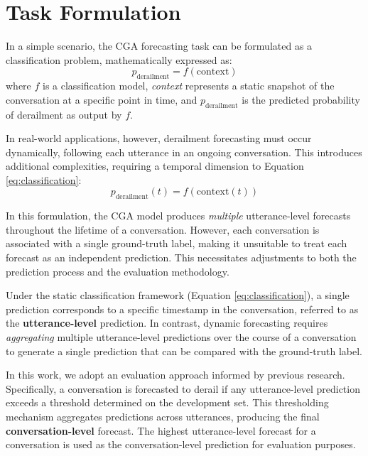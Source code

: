 \section{Task Formulation}
In a simple scenario, the CGA forecasting task can be formulated as a classification problem, mathematically expressed as:
\begin{equation}
p_{\mathrm{derailment}} = f(\mathrm{context})
\label{eq:classification}
\end{equation}
where $f$ is a classification model, \emph{context} represents a static snapshot of the conversation at a specific point in time, and $p_{\mathrm{derailment}}$ is the predicted probability of derailment as output by $f$.

In real-world applications, however, derailment forecasting must occur dynamically, following each utterance in an ongoing conversation. This introduces additional complexities, requiring a temporal dimension to Equation \ref{eq:classification}:
\begin{equation}
p_{\mathrm{derailment}}(t) = f(\mathrm{context}(t))
\label{eq:forecastingmodel}
\end{equation}

In this formulation, the CGA model produces \emph{multiple} utterance-level forecasts throughout the lifetime of a conversation. However, each conversation is associated with a single ground-truth label, making it unsuitable to treat each forecast as an independent prediction. This necessitates adjustments to both the prediction process and the evaluation methodology.

Under the static classification framework (Equation \ref{eq:classification}), a single prediction corresponds to a specific timestamp in the conversation, referred to as the \textbf{utterance-level} prediction. In contrast, dynamic forecasting requires \emph{aggregating} multiple utterance-level predictions over the course of a conversation to generate a single prediction that can be compared with the ground-truth label.

In this work, we adopt an evaluation approach informed by previous research. Specifically, a conversation is forecasted to derail if any utterance-level prediction exceeds a threshold determined on the development set. This thresholding mechanism aggregates predictions across utterances, producing the final \textbf{conversation-level} forecast. The highest utterance-level forecast for a conversation is used as the conversation-level prediction for evaluation purposes.